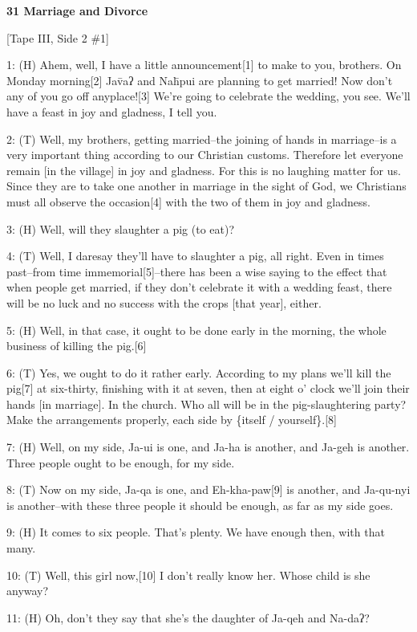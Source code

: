 
\textbf{31 Marriage and Divorce}

[Tape III, Side 2 \#1]

1: (H) Ahem, well, I have a little announcement[1] to make to you, brothers. On
Monday morning[2] Jav̄aʔ and Nah̄pui are planning to get married! Now don't
any of you go off anyplace![3] We're going to celebrate the wedding, you see. We'll
have a feast in joy and gladness, I tell you.

2: (T) Well, my brothers, getting married--the joining of hands in marriage--is
a very important thing according to our Christian customs. Therefore let everyone
remain [in the village] in joy and gladness. For this is no laughing matter for
us. Since they are to take one another in marriage in the sight of God, we Christians
must all observe the occasion[4] with the two of them in joy and gladness.

3: (H) Well, will they slaughter a pig (to eat)?

4: (T) Well, I daresay they'll have to slaughter a pig, all right. Even in times
past--from time immemorial[5]--there has been a wise saying to the effect that
when people get married, if they don't celebrate it with a wedding feast, there
will be no luck and no success with the crops [that year], either.

5: (H) Well, in that case, it ought to be done early in the morning, the whole
business of killing the pig.[6]

6: (T) Yes, we ought to do it rather early. According to my plans we'll kill the
pig[7] at six-thirty, finishing with it at seven, then at eight o' clock we'll
join their hands [in marriage]. In the church. Who all will be in the pig-slaughtering
party? Make the arrangements properly, each side by \{itself / yourself\}.[8]

7: (H) Well, on my side, Ja-ui is one, and Ja-ha is another, and Ja-geh is another.
Three people ought to be enough, for my side.

8: (T) Now on my side, Ja-qa is one, and Eh-kha-paw[9] is another, and Ja-qu-nyi
is another--with these three people it should be enough, as far as my side goes.

9: (H) It comes to six people. That's plenty. We have enough then, with that many.

10: (T) Well, this girl now,[10] I don't really know her. Whose child is she anyway?

11: (H) Oh, don't they say that she's the daughter of Ja-qeh and Na-daʔ?

